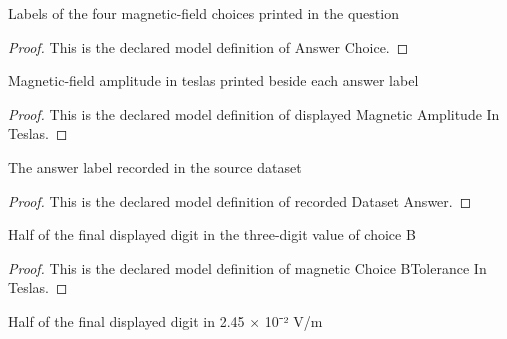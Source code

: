 \begin{definition}
  \label{def:physics:phyx-mini-0944:phyxminiproblems-problemphyxmini0944-answerchoice}
  Labels of the four magnetic-field choices printed in the question
\end{definition}
\begin{proof}
  This is the declared model definition of Answer Choice.
\end{proof}
\begin{definition}
  \label{def:physics:phyx-mini-0944:phyxminiproblems-problemphyxmini0944-displayedmagneticamplitudeinteslas}
  Magnetic-field amplitude in teslas printed beside each answer label
\end{definition}
\begin{proof}
  This is the declared model definition of displayed Magnetic Amplitude In Teslas.
\end{proof}
\begin{definition}
  \label{def:physics:phyx-mini-0944:phyxminiproblems-problemphyxmini0944-recordeddatasetanswer}
  The answer label recorded in the source dataset
\end{definition}
\begin{proof}
  This is the declared model definition of recorded Dataset Answer.
\end{proof}
\begin{definition}
  \label{def:physics:phyx-mini-0944:phyxminiproblems-problemphyxmini0944-magneticchoicebtoleranceinteslas}
  Half of the final displayed digit in the three-digit value of choice B
\end{definition}
\begin{proof}
  This is the declared model definition of magnetic Choice BTolerance In Teslas.
\end{proof}
\begin{definition}
  \label{def:physics:phyx-mini-0944:phyxminiproblems-problemphyxmini0944-electricamplitudetoleranceinvoltspermeter}
  Half of the final displayed digit in 2.45 × 10⁻² V/m
\end{definition}
